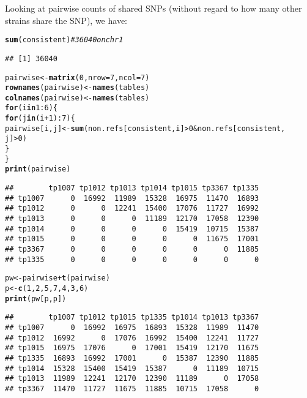 \documentclass{article}\usepackage[]{graphicx}\usepackage[]{color}
\makeatletter
\newcommand{\hlnum}[1]{\textcolor[rgb]{0.686,0.059,0.569}{#1}}%
\newcommand{\hlcom}[1]{\textcolor[rgb]{0.678,0.584,0.686}{\textit{#1}}}%
\newcommand{\hlopt}[1]{\textcolor[rgb]{0,0,0}{#1}}%
\newcommand{\hlstd}[1]{\textcolor[rgb]{0.345,0.345,0.345}{#1}}%
\newcommand{\hlkwa}[1]{\textcolor[rgb]{0.161,0.373,0.58}{\textbf{#1}}}%
\newcommand{\hlkwb}[1]{\textcolor[rgb]{0.69,0.353,0.396}{#1}}%
\newcommand{\hlkwc}[1]{\textcolor[rgb]{0.333,0.667,0.333}{#1}}%
\newcommand{\hlkwd}[1]{\textcolor[rgb]{0.737,0.353,0.396}{\textbf{#1}}}%
\newenvironment{kframe}{%
 \def\at@end@of@kframe{}%
 \ifinner\ifhmode%
  \def\at@end@of@kframe{\end{minipage}}%
  \begin{minipage}{\columnwidth}%
 \fi\fi%
 \def\FrameCommand##1{\hskip\@totalleftmargin \hskip-\fboxsep
 \colorbox{shadecolor}{##1}\hskip-\fboxsep
     \hskip-\linewidth \hskip-\@totalleftmargin \hskip\columnwidth}%
 \MakeFramed {\advance\hsize-\width
   \@totalleftmargin\z@ \linewidth\hsize
   \@setminipage}}%
 {\par\unskip\endMakeFramed%
 \at@end@of@kframe}
\newenvironment{knitrout}{}{} %
\makeatother
\begin{document}
Looking at pairwise counts of shared SNPs (without regard to how many other strains share the SNP), we have:
\begin{knitrout}\small
{}\color{fgcolor}\begin{kframe}
\begin{alltt}
\hlkwd{sum}\hlstd{(consistent)}  \hlcom{# 36040 on chr1}
\end{alltt}
\begin{verbatim}
## [1] 36040
\end{verbatim}
\begin{alltt}
\hlstd{pairwise} \hlkwb{<-} \hlkwd{matrix}\hlstd{(}\hlnum{0}\hlstd{,} \hlkwc{nrow} \hlstd{=} \hlnum{7}\hlstd{,} \hlkwc{ncol} \hlstd{=} \hlnum{7}\hlstd{)}
\hlkwd{rownames}\hlstd{(pairwise)} \hlkwb{<-} \hlkwd{names}\hlstd{(tables)}
\hlkwd{colnames}\hlstd{(pairwise)} \hlkwb{<-} \hlkwd{names}\hlstd{(tables)}
\hlkwa{for} \hlstd{(i} \hlkwa{in} \hlnum{1}\hlopt{:}\hlnum{6}\hlstd{) \{}
    \hlkwa{for} \hlstd{(j} \hlkwa{in} \hlstd{(i} \hlopt{+} \hlnum{1}\hlstd{)}\hlopt{:}\hlnum{7}\hlstd{) \{}
        \hlstd{pairwise[i, j]} \hlkwb{<-} \hlkwd{sum}\hlstd{(non.refs[consistent, i]} \hlopt{>} \hlnum{0} \hlopt{&} \hlstd{non.refs[consistent,}
            \hlstd{j]} \hlopt{>} \hlnum{0}\hlstd{)}
    \hlstd{\}}
\hlstd{\}}
\hlkwd{print}\hlstd{(pairwise)}
\end{alltt}
\begin{verbatim}
##        tp1007 tp1012 tp1013 tp1014 tp1015 tp3367 tp1335
## tp1007      0  16992  11989  15328  16975  11470  16893
## tp1012      0      0  12241  15400  17076  11727  16992
## tp1013      0      0      0  11189  12170  17058  12390
## tp1014      0      0      0      0  15419  10715  15387
## tp1015      0      0      0      0      0  11675  17001
## tp3367      0      0      0      0      0      0  11885
## tp1335      0      0      0      0      0      0      0
\end{verbatim}
\begin{alltt}
\hlstd{pw} \hlkwb{<-} \hlstd{pairwise} \hlopt{+} \hlkwd{t}\hlstd{(pairwise)}
\hlstd{p} \hlkwb{<-} \hlkwd{c}\hlstd{(}\hlnum{1}\hlstd{,} \hlnum{2}\hlstd{,} \hlnum{5}\hlstd{,} \hlnum{7}\hlstd{,} \hlnum{4}\hlstd{,} \hlnum{3}\hlstd{,} \hlnum{6}\hlstd{)}
\hlkwd{print}\hlstd{(pw[p, p])}
\end{alltt}
\begin{verbatim}
##        tp1007 tp1012 tp1015 tp1335 tp1014 tp1013 tp3367
## tp1007      0  16992  16975  16893  15328  11989  11470
## tp1012  16992      0  17076  16992  15400  12241  11727
## tp1015  16975  17076      0  17001  15419  12170  11675
## tp1335  16893  16992  17001      0  15387  12390  11885
## tp1014  15328  15400  15419  15387      0  11189  10715
## tp1013  11989  12241  12170  12390  11189      0  17058
## tp3367  11470  11727  11675  11885  10715  17058      0
\end{verbatim}
\end{kframe}
\end{knitrout}
\end{document}
